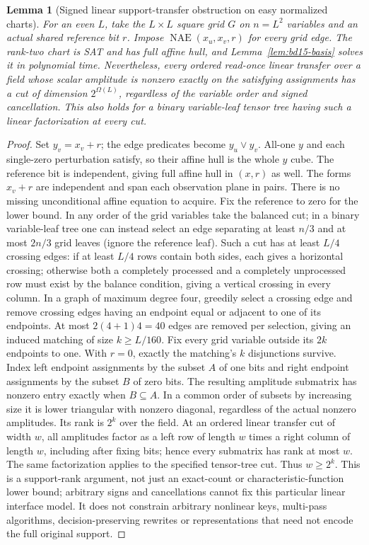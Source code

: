 \documentclass[11pt]{article}
\newtheorem{lemma}[theorem]{Lemma}
\begin{document}
\begin{lemma}[Signed linear support-transfer obstruction on easy normalized charts]\label{lem:bd15-rank}
For an even $L$, take the $L\times L$ square grid $G$ on $n=L^2$ variables and an actual shared reference bit $r$. Impose $\operatorname{NAE}(x_u,x_v,r)$ for every grid edge. The rank-two chart is SAT and has full affine hull, and Lemma~\ref{lem:bd15-basis} solves it in polynomial time. Nevertheless, every ordered read-once linear transfer over a field whose scalar amplitude is nonzero exactly on the satisfying assignments has a cut of dimension $2^{\Omega(L)}$, regardless of the variable order and signed cancellation. This also holds for a binary variable-leaf tensor tree having such a linear factorization at every cut.
\end{lemma}
\begin{proof}
Set $y_v=x_v+r$; the edge predicates become $y_u\lor y_v$. All-one $y$ and each single-zero perturbation satisfy, so their affine hull is the whole $y$ cube. The reference bit is independent, giving full affine hull in $(x,r)$ as well. The forms $x_v+r$ are independent and span each observation plane in pairs. There is no missing unconditional affine equation to acquire.
Fix the reference to zero for the lower bound. In any order of the grid variables take the balanced cut; in a binary variable-leaf tree one can instead select an edge separating at least $n/3$ and at most $2n/3$ grid leaves (ignore the reference leaf). Such a cut has at least $L/4$ crossing edges: if at least $L/4$ rows contain both sides, each gives a horizontal crossing; otherwise both a completely processed and a completely unprocessed row must exist by the balance condition, giving a vertical crossing in every column. In a graph of maximum degree four, greedily select a crossing edge and remove crossing edges having an endpoint equal or adjacent to one of its endpoints. At most $2(4+1)4=40$ edges are removed per selection, giving an induced matching of size $k\ge L/160$.
Fix every grid variable outside its $2k$ endpoints to one. With $r=0$, exactly the matching's $k$ disjunctions survive. Index left endpoint assignments by the subset $A$ of one bits and right endpoint assignments by the subset $B$ of zero bits. The resulting amplitude submatrix has nonzero entry exactly when $B\subseteq A$. In a common order of subsets by increasing size it is lower triangular with nonzero diagonal, regardless of the actual nonzero amplitudes. Its rank is $2^k$ over the field. At an ordered linear transfer cut of width $w$, all amplitudes factor as a left row of length $w$ times a right column of length $w$, including after fixing bits; hence every submatrix has rank at most $w$. The same factorization applies to the specified tensor-tree cut. Thus $w\ge2^k$. This is a support-rank argument, not just an exact-count or characteristic-function lower bound; arbitrary signs and cancellations cannot fix this particular linear interface model. It does not constrain arbitrary nonlinear keys, multi-pass algorithms, decision-preserving rewrites or representations that need not encode the full original support.
\end{proof}
\end{document}

